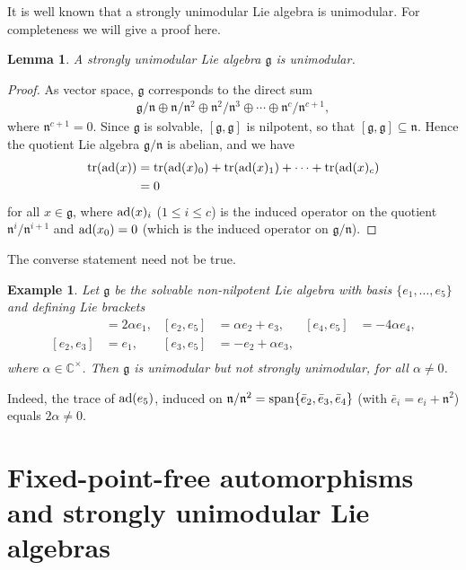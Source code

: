\documentclass[12pt]{amsart}
\newtheorem{lem}[thm]{Lemma}
\newtheorem{ex}[thm]{Example}
\theoremstyle{definition}
\theoremstyle{remark}
\newcommand{\C}{\mathbb{C}}
\newcommand{\tr}{\mathop{\rm tr}}
\newcommand{\ad}{{\rm ad}}
\newcommand{\Lg}{\mathfrak{g}}
\newcommand{\Ln}{\mathfrak{n}}
\newcommand{\al}{\alpha}
\begin{document}
It is well known that a strongly unimodular Lie algebra is unimodular. For completeness we will
give a proof here.

\begin{lem}\label{2.9}
A strongly unimodular Lie algebra $\Lg$ is unimodular.
\end{lem}

\begin{proof}
As vector space, $\Lg$ corresponds to the direct sum 
\begin{align*}
\Lg/\Ln \oplus \Ln/\Ln^2\oplus \Ln^2/\Ln^3 \oplus \cdots \oplus \Ln^c/\Ln^{c+1}, 
\end{align*}
where $\Ln^{c+1}=0$. Since $\Lg$ is solvable, $[\Lg,\Lg]$ is nilpotent, so that $[\Lg,\Lg]\subseteq \Ln$.
Hence the quotient Lie algebra $\Lg/\Ln$ is abelian, and we have
\begin{align*}
\tr(\ad(x)) & =\tr(\ad(x)_{0})+\tr(\ad(x)_{1})+ \cdots + \tr(\ad(x)_{c}) \\
            & = 0
\end{align*}
for all $x\in \Lg$, where $\ad(x)_i$ ($1\leq i \leq c$) is the induced operator on the quotient $\Ln^{i}/\Ln^{i+1}$ and $\ad(x_0) =0$ (which is the induced operator on $\Lg/\Ln$).
\end{proof}  

The converse statement need not be true.

\begin{ex}
Let $\Lg$ be the solvable non-nilpotent Lie algebra with basis $\{e_1,\ldots ,e_5\}$ and
defining Lie brackets
\vspace*{0.5cm}
\begin{align*}
[e_1,e_5] & = 2\al e_1,  & [e_2,e_5] & = \al e_2+e_3,    & [e_4,e_5]& =-4\al e_4,\\
[e_2,e_3] & = e_1,       & [e_3,e_5] & = -e_2+\al e_3,   &                  \\
\end{align*}
where $\al\in \C^{\times}$. Then $\Lg$ is unimodular but not strongly unimodular,
for all $\al\neq 0$.
\end{ex}

Indeed, the trace of $\ad(e_5)$, induced on $\Ln/\Ln^2={\rm span}\{\bar e_2,\bar e_3,\bar e_4\}$ (with $\bar e_i = e_i + \Ln^2$) equals $2\al\neq 0$.



\section{Fixed-point-free automorphisms and strongly unimodular Lie algebras}
\end{document}
